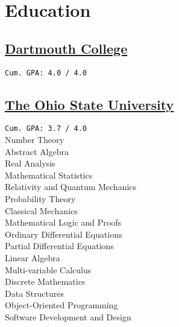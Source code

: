 \documentclass[]{Farhan_Resume_Class}
\begin{document}
%
%

%
%

%
%

\begin{minipage}[t]{0.27\textwidth}

    \section{Education}
    \subsection{\href{https://dartmouth.edu/}{Dartmouth College}}
    \texttt{Cum. GPA: 4.0 / 4.0} \\
    
    \sectionsep
    \subsection{\href{https://www.osu.edu/}{The Ohio State University}}
    \texttt{Cum. GPA: 3.7 / 4.0} \\
    Number Theory \\ Abstract Algebra \\
    Real Analysis \\
    Mathematical Statistics \\
    Relativity and Quantum Mechanics \\
    Probability Theory \\
    Classical Mechanics \\
    Mathematical Logic and Proofs \\
    Ordinary Differential Equations \\
    Partial Differential Equations \\
    Linear Algebra\\
    Multi-variable Calculus\\
    Discrete Mathematics\\
    Data Structures \\
    Object-Oriented Programming\\
    Software Development and Design\\


\end{minipage}
\end{document}
